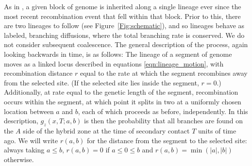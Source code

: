 \documentclass[11pt,letterpaper]{article}
\begin{document}
As in \citet{sedghifar2015spatial}, 
a given block of genome is inherited along a single lineage ever since the most recent recombination event
that fell within that block.
Prior to this, there are two lineages to follow (see Figure~\ref{Fig:schematic}),
and so lineages behave as labeled, branching diffusions,
where the total branching rate is conserved. 
We do not consider subsequent coalescence.
The general description of the process, again looking backwards in time, is as follows:
The lineage of a segment of genome moves as a linked locus described in equations \eqref{eqn:lineage_motion},
with recombination distance $r$ equal to the rate at which the segment recombines away from the selected site.
(If the selected site lies inside the segment, $r=0$.)
Additionally, at rate equal to the genetic length of the segment,
recombination occurs within the segment, at which point it splits in two at a uniformly chosen location between $a$ and $b$,
each of which proceeds as before, independently. 
In this description,
$g_z(x,T;a,b)$ is then the probability that all branches are found on the $A$ side of the hybrid zone
at the time of secondary contact $T$ units of time ago.
We will write $r(a,b)$ for the distance from the segment to the selected site:
always taking $a \le b$,
$r(a,b)=0$ if $a \le 0 \le b$ and $r(a,b)=\min(|a|,|b|)$ otherwise.
\end{document}
